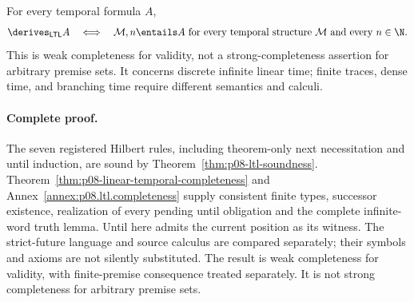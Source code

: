 \begin{theorem}
For every temporal formula \(A\),
\[
  \derives_{\mathsf{LTL}}A
  \quad\Longleftrightarrow\quad
  \mathcal M,n\entails A
  \text{ for every temporal structure \(\mathcal M\) and every \(n\in\N\)}.
\]
This is weak completeness for validity, not a strong-completeness assertion
for arbitrary premise sets.  It concerns discrete infinite linear time;
finite traces, dense time, and branching time require different semantics and
calculi.
\end{theorem}

\paragraph{Complete proof.}
The seven registered Hilbert rules, including theorem-only next necessitation
and until induction, are sound by Theorem~\ref{thm:p08-ltl-soundness}.
Theorem~\ref{thm:p08-linear-temporal-completeness} and
Annex~\ref{annex:p08.ltl.completeness} supply consistent finite types,
successor existence, realization of every pending until obligation and the
complete infinite-word truth lemma. Until here admits the current position
as its witness. The strict-future language and source calculus are compared
separately; their symbols and axioms are not silently substituted. The result
is weak completeness for validity, with finite-premise consequence treated
separately. It is not strong completeness for arbitrary premise sets.
